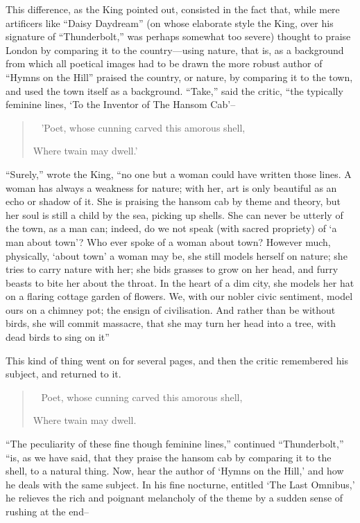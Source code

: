 \documentclass{book}
\newenvironment{mdblockquote}{%
  \begin{quotation}
    \
}{%
  \end{quotation}
}
\begin{document}
This difference, as the King pointed out, consisted in the fact that, while mere artificers like “Daisy Daydream” (on whose elaborate style the King, over his signature of “Thunderbolt,” was perhaps somewhat too severe) thought to praise London by comparing it to the country—using nature, that is, as a background from which all poetical images had to be drawn the more robust author of “Hymns on the Hill” praised the country, or nature, by comparing it to the town, and used the town itself as a background. “Take,” said the critic, “the typically feminine lines, ‘To the Inventor of The Hansom Cab’–

\begin{mdblockquote}
	’Poet, whose cunning carved this amorous shell,

	Where twain may dwell.’


\end{mdblockquote}
“Surely,” wrote the King, “no one but a woman could have written those lines. A woman has always a weakness for nature; with her, art is only beautiful as an echo or shadow of it. She is praising the hansom cab by theme and theory, but her soul is still a child by the sea, picking up shells. She can never be utterly of the town, as a man can; indeed, do we not speak (with sacred propriety) of ‘a man about town’? Who ever spoke of a woman about town? However much, physically, ‘about town’ a woman may be, she still models herself on nature; she tries to carry nature with her; she bids grasses to grow on her head, and furry beasts to bite her about the throat. In the heart of a dim city, she models her hat on a flaring cottage garden of flowers. We, with our nobler civic sentiment, model ours on a chimney pot; the ensign of civilisation. And rather than be without birds, she will commit massacre, that she may turn her head into a tree, with dead birds to sing on it”

This kind of thing went on for several pages, and then the critic remembered his subject, and returned to it.

\begin{mdblockquote}
	Poet, whose cunning carved this amorous shell,

	Where twain may dwell.


\end{mdblockquote}
“The peculiarity of these fine though feminine lines,” continued “Thunderbolt,” “is, as we have said, that they praise the hansom cab by comparing it to the shell, to a natural thing. Now, hear the author of ‘Hymns on the Hill,’ and how he deals with the same subject. In his fine nocturne, entitled ‘The Last Omnibus,’ he relieves the rich and poignant melancholy of the theme by a sudden sense of rushing at the end–
\end{document}
